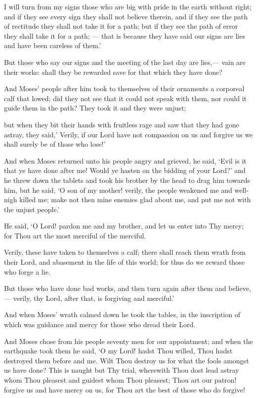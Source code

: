 \documentclass[fontsize=14pt, letterpaper, notitlepage, openany, DIV=12]{scrbook} %
\begin{document}
\noindent[7:146]
I will turn from my signs those who are big with pride in the earth without right; and if
they see every sign they shall not believe therein, and if they see the path of rectitude they shall
not take it for a path; but if they see the path of error they shall take it for a path; --- that is
because they have said our signs are lies and have been careless of them.'

\noindent[7:147]
But those who say our signs and the meeting of the last day are lies,--- vain are their
works: shall they be rewarded save for that which they have done?

\noindent[7:148]
And Moses' people after him took to themselves of their ornaments a corporeal calf that
lowed; did they not see that it could not speak with them, nor could it guide them in the path?
They took it and they were unjust;

\noindent[7:149]
but when they bit their hands with fruitless rage and saw that they had gone astray, they
said,' Verily, if our Lord have not compassion on us and forgive us we shall surely be of those
who lose!'

\noindent[7:150]
And when Moses returned unto his people angry and grieved, he said, `Evil is it that ye
have done after me! Would ye hasten on the bidding of your Lord?' and he threw down the
tablets and took his brother by the head to drag him towards him, but he said, `O son of my
mother! verily, the people weakened me and well-nigh killed me; make not then mine enemies
glad about me, and put me not with the unjust people.'

\noindent[7:151]
He said, `O Lord! pardon me and my brother, and let us enter into Thy mercy; for Thou
art the most merciful of the merciful.

\noindent[7:152]
Verily, these have taken to themselves a calf; there shall reach them wrath from their
Lord, and abasement in the life of this world; for thus do we reward those who forge a lie.

\noindent[7:153]
But those who have done bad works, and then turn again after them and believe,--- verily,
thy Lord, after that, is forgiving and merciful.'

\noindent[7:154]
And when Moses' wrath calmed down he took the tables, in the inscription of which was
guidance and mercy for those who dread their Lord.

\noindent[7:155]
And Moses chose from his people seventy men for our appointment; and when the
earthquake took them he said, `O my Lord! hadst Thou willed, Thou hadst destroyed them before
and me. Wilt Thou destroy us for what the fools amongst us have done? This is naught but Thy
trial, wherewith Thou dost lead astray whom Thou pleasest and guidest whom Thou pleasest;
Thou art our patron! forgive us and have mercy on us, for Thou art the best of those who do
forgive!
\end{document}
